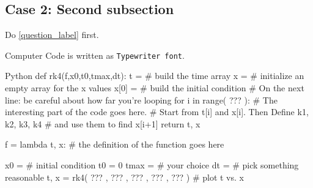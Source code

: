 \subsection{Case 2: Second subsection}
Do \cref{question_label} first.

Computer Code is written as {\tt Typewriter font}.

\begin{code}{Python}
    def rk4(f,x0,t0,tmax,dt):
        t = # build the time array
        x = # initialize an empty array for the x values
        x[0] = # build the initial condition
        # On the next line: be careful about how far you're looping
        for i in range( ??? ):
        # The interesting part of the code goes here.
        # Start from t[i] and x[i]. Then Define k1, k2, k3, k4 
        # and use them to find x[i+1]
        return t, x
        
    f = lambda t, x: # the definition of the function goes here
    
    x0 = # initial condition
    t0 = 0
    tmax = # your choice
    dt = # pick something reasonable
    t, x = rk4( ??? , ??? , ??? , ??? , ??? )
    # plot t vs. x
\end{code}
